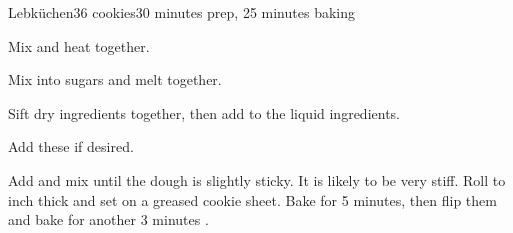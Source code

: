 \documentclass[../Cookbook.tex]{subfiles}
\begin{document}
\begin{recipe}{Lebk\"uchen}{36 cookies}{30 minutes prep, 25 minutes baking}


	Mix and heat together.

	Mix into sugars and melt together.

	Sift dry ingredients together, then add to the liquid ingredients.

	Add these if desired.

	Add and mix until the dough is slightly sticky. It is likely to be very stiff. Roll to  inch thick and set on a greased cookie sheet. Bake for
	5 minutes, then flip them and bake for another 3 minutes%
	.

\end{recipe}
\end{document}
